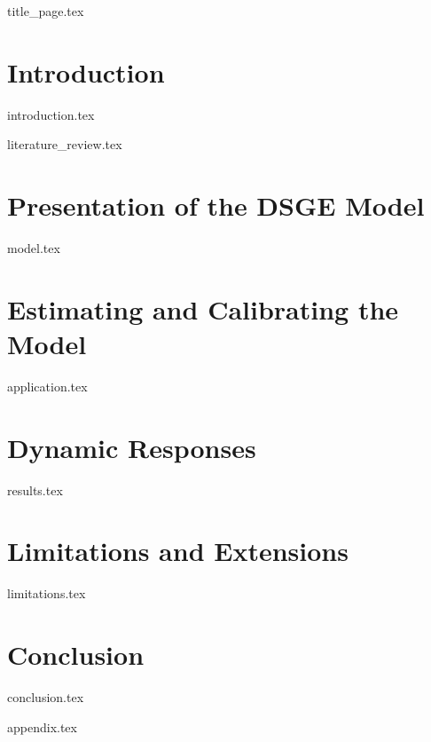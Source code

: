 \documentclass[12pt]{article}
\begin{document}
\setlength{\abovecaptionskip}{0pt}
\begin{sloppypar}
{title_page.tex}
\pagebreak
\tableofcontents
\pagebreak
{}

\section{Introduction}
{introduction.tex}
\newpage

{literature_review.tex}
\newpage

\section{Presentation of the DSGE Model}
{model.tex}
\newpage

\section{Estimating and Calibrating the Model} \label{application}
{application.tex}
\newpage

\section{Dynamic Responses}
{results.tex}
\newpage

\section{Limitations and Extensions}
{limitations.tex}
\newpage

\section{Conclusion}
{conclusion.tex}
\newpage
\printbibliography
\newpage

{appendix.tex}
\end{sloppypar}
\end{document}
